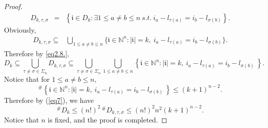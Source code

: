 \documentclass[11pt]{article}
\theoremstyle{plain}
\theoremstyle{definition}
\begin{document}
\begin{proof}
	\begin{eqnarray*}\label{eq2.7.11}
		D_{k,\tau ,\sigma}&=&\left \{   \mathfrak{i} \in D_{k}: \exists 1\leq a \neq b\leq n ~s.t.~ i_{a}-l_{\tau  (a)} =i_{b}-l_{\sigma  (b)}\right\}.
\end{eqnarray*}
Obviously,
\begin{eqnarray*}
 D_{k,\tau ,\sigma}\subseteq& \bigcup\limits_{1 \le a \ne b \le n} \{\mathfrak{i} \in \mathbb{N}^n: |\mathfrak{i}|=k, \ i_{a}-l_{\tau  (a)} =i_{b}-l_{\sigma  (b)} \}.
	\end{eqnarray*}
	Therefore by \eqref{eq2.8.},
	\begin{equation}\label{eq7}
		D_{k} \subseteq \bigcup\limits_{\tau \ne \sigma \in \Sigma_{n}}	D_{k,\tau ,\sigma} \subseteq \bigcup\limits_{\tau \ne \sigma \in \Sigma_{n}} \bigcup\limits_{1 \le a \ne b \le n}\left \{\mathfrak{i} \in \mathbb{N}^n: |\mathfrak{i}|=k, \ i_{a}-l_{\tau  (a)} =i_{b}-l_{\sigma  (b)}   \   \right \}.
	\end{equation}
	Notice that for $1 \le a \ne b \le n,$
 $$
 ^{\#  } \left \{\mathfrak{i}\in \mathbb{N}^n: |\mathfrak{i}|=k, \ i_{a}-l_{\tau  (a)} =i_{b}-l_{\sigma  (b)}   \   \right \}  \le \left ( k+1 \right ) ^{n-2}.
 $$ 
 Therefore by (\ref{eq7}), we have 
$$^{\#  } D_{k}  \leq (n!)^{2}\,^{\#  } D_{k,\tau ,\sigma} \le (n!)^{2}n^{2}\left ( k+1 \right ) ^{n-2}.$$
	Notice that $n$ is fixed, and the proof is completed.
\end{proof}

\end{document}
